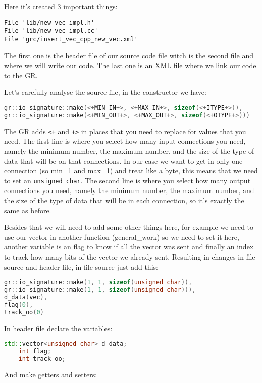\documentclass[a4paper, 10pt, conference]{ieeeconf}      %
\begin{document}
    Here it's created 3 important things:
\begin{verbatim}
File 'lib/new_vec_impl.h'
File 'lib/new_vec_impl.cc'
File 'grc/insert_vec_cpp_new_vec.xml'
\end{verbatim}

    The first one is the header file of our source code file witch is the second file and where we will write our code. The last one is an XML file where we link our code to the GR.
    
    Let's carefully analyse the source file, in the constructor we have:
\begin{lstlisting}[language=c++, breaklines]
gr::io_signature::make(<+MIN_IN+>, <+MAX_IN+>, sizeof(<+ITYPE+>)),
gr::io_signature::make(<+MIN_OUT+>, <+MAX_OUT+>, sizeof(<+OTYPE+>)))
\end{lstlisting}

    The GR adds \verb|<+| and \verb|+>| in places that you need to replace for values that you need. The first line is where you select how many input connections you need, namely the minimum number, the maximum number, and the size of the type of data that will be on that connections. In our case we want to get in only one connection (so min=1 and max=1) and treat like a byte, this means that we need to set an \verb|unsigned char|.
    The second line is where you select how many output connections you need, namely the minimum number, the maximum number, and the size of the type of data that will be in each connection, so it's exactly the same as before.
    
    Besides that we will need to add some other things here, for example we need to use our vector in another function (general\_work) so we need to set it here, another variable is an flag to know if all the vector was sent and finally an index to track how many bits of the vector we already sent.
    Resulting in changes in file source and header file, in file source just add this:
\begin{lstlisting}[language=c++, breaklines]   
gr::io_signature::make(1, 1, sizeof(unsigned char)),
gr::io_signature::make(1, 1, sizeof(unsigned char))),
d_data(vec),
flag(0),
track_oo(0)
\end{lstlisting}  

    In header file declare the variables:
\begin{lstlisting}[language=c++, breaklines] 
    std::vector<unsigned char> d_data;
    int flag;
    int track_oo;
\end{lstlisting} 
    And make getters and setters:
    
\end{document}
